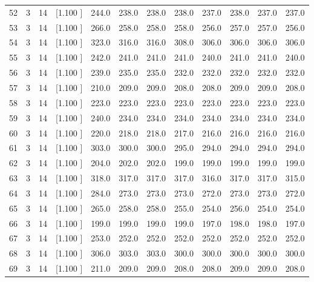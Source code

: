 \documentclass[12pt,a4paper]{article}
\begin{document}
\begin{center}
{\begin{tabular}{r r r r r r r r r r r r}
  52&  3& 14&[1.100     ]&   244.0&   238.0&   238.0&   238.0&   237.0&   238.0&   237.0&   237.0\\[-0.02in]
  53&  3& 14&[1.100     ]&   266.0&   258.0&   258.0&   258.0&   256.0&   257.0&   257.0&   256.0\\[-0.02in]
  54&  3& 14&[1.100     ]&   323.0&   316.0&   316.0&   308.0&   306.0&   306.0&   306.0&   306.0\\[-0.02in]
  55&  3& 14&[1.100     ]&   242.0&   241.0&   241.0&   241.0&   240.0&   241.0&   241.0&   240.0\\[-0.02in]
  56&  3& 14&[1.100     ]&   239.0&   235.0&   235.0&   232.0&   232.0&   232.0&   232.0&   232.0\\[-0.02in]
  57&  3& 14&[1.100     ]&   210.0&   209.0&   209.0&   208.0&   208.0&   209.0&   209.0&   208.0\\[-0.02in]
  58&  3& 14&[1.100     ]&   223.0&   223.0&   223.0&   223.0&   223.0&   223.0&   223.0&   223.0\\[-0.02in]
  59&  3& 14&[1.100     ]&   240.0&   234.0&   234.0&   234.0&   234.0&   234.0&   234.0&   234.0\\[-0.02in]
  60&  3& 14&[1.100     ]&   220.0&   218.0&   218.0&   217.0&   216.0&   216.0&   216.0&   216.0\\[-0.02in]
  61&  3& 14&[1.100     ]&   303.0&   300.0&   300.0&   295.0&   294.0&   294.0&   294.0&   294.0\\[-0.02in]
  62&  3& 14&[1.100     ]&   204.0&   202.0&   202.0&   199.0&   199.0&   199.0&   199.0&   199.0\\[-0.02in]
  63&  3& 14&[1.100     ]&   318.0&   317.0&   317.0&   317.0&   316.0&   317.0&   317.0&   315.0\\[-0.02in]
  64&  3& 14&[1.100     ]&   284.0&   273.0&   273.0&   273.0&   272.0&   273.0&   273.0&   272.0\\[-0.02in]
  65&  3& 14&[1.100     ]&   265.0&   258.0&   258.0&   255.0&   254.0&   256.0&   254.0&   254.0\\[-0.02in]
  66&  3& 14&[1.100     ]&   199.0&   199.0&   199.0&   199.0&   197.0&   198.0&   198.0&   197.0\\[-0.02in]
  67&  3& 14&[1.100     ]&   253.0&   252.0&   252.0&   252.0&   252.0&   252.0&   252.0&   252.0\\[-0.02in]
  68&  3& 14&[1.100     ]&   306.0&   303.0&   303.0&   300.0&   300.0&   300.0&   300.0&   300.0\\[-0.02in]
  69&  3& 14&[1.100     ]&   211.0&   209.0&   209.0&   208.0&   208.0&   209.0&   209.0&   208.0\\[-0.02in]

\end{tabular}}
\end{center}
\end{document}
